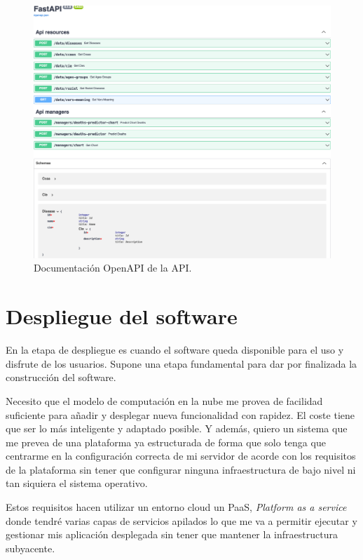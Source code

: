 \begin{figure}[h]
	\centering	
	\includegraphics[width=\textwidth]{doc/logos/imgs/openapi.png}
	\caption{ Documentación OpenAPI de la API. }
    \label{fig:worst_f_value}
\end{figure}



\chapter{Despliegue del software}
En la etapa de despliegue es cuando el software queda disponible para el uso y disfrute de
los usuarios. Supone una etapa fundamental para dar por finalizada la construcción del
software. 

Necesito que el modelo de computación en la nube me provea de facilidad suficiente para
añadir y desplegar nueva funcionalidad con rapidez. El coste tiene que ser lo más
inteligente y adaptado posible. Y además, quiero un sistema que me prevea de una
plataforma ya estructurada de forma que solo tenga que centrarme en la configuración
correcta de mi servidor de acorde con los requisitos de la plataforma sin tener que
configurar ninguna infraestructura de bajo nivel ni tan siquiera el sistema operativo.

Estos requisitos hacen utilizar un entorno cloud un PaaS, \textit{Platform as a service}
donde tendré varias capas de servicios apilados lo que me va a permitir ejecutar y
gestionar mis aplicación desplegada sin tener que mantener la infraestructura subyacente.

